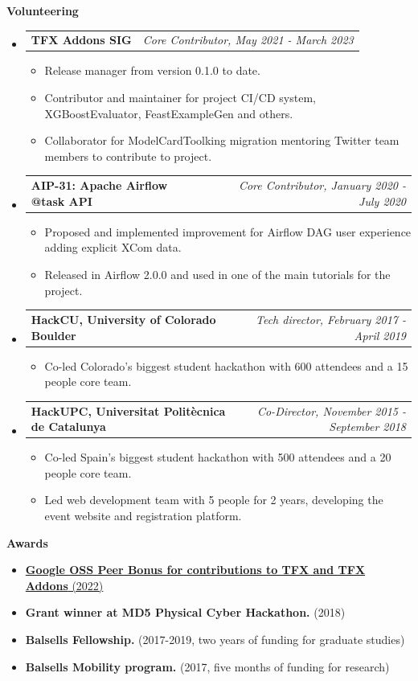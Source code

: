 \documentclass[letterpaper,10pt]{article}
\makeatletter
\newcommand{\resitem}[1]{\item #1 \vspace{-2pt}}
\newcommand{\resheading}[1]{{\large \colorbox{mygrey}{\begin{minipage}{\textwidth}{\textbf{#1 \vphantom{p\^{E}}}}\end{minipage}}}}
\newcommand{\ressubheading}[4]{
\begin{tabular*}{7.0in}{l@{\extracolsep{\fill}}r}
		\textbf{#1} & \textit{#4} \\
\end{tabular*}\vspace{-6pt}}
\makeatother
\begin{document}
\resheading{Volunteering}
	\begin{itemize}
\item 
		\ressubheading{TFX Addons SIG}{Boulder, CO}{Core Contributor}{Core Contributor, May 2021 - March 2023}
			\begin{itemize}
				\resitem{Release manager from version 0.1.0 to date.}
				\resitem{Contributor and maintainer for project CI/CD system, XGBoostEvaluator, FeastExampleGen and others.}
				\resitem{Collaborator for ModelCardToolking migration mentoring Twitter team members to contribute to project.} 
			\end{itemize}
		\item
			\ressubheading{AIP-31: Apache Airflow @task API}{Boulder, CO, USA}{ML Engineer}{Core Contributor, January 2020 - July 2020}
			\begin{itemize}
				\resitem{Proposed and implemented improvement for Airflow DAG user experience adding explicit XCom data.}
				\resitem{Released in Airflow 2.0.0 and used in one of the main tutorials for the project.}
				
			\end{itemize}
		\item 
			\ressubheading{HackCU, University of Colorado Boulder}{Boulder, CO}{Tech director}{Tech director, February 2017 - April 2019}
			\begin{itemize}
				\resitem{Co-led Colorado's biggest student hackathon with 600 attendees and a 15 people core team.}
			\end{itemize}
		\item
			\ressubheading{HackUPC, Universitat Polit\`ecnica de Catalunya}{Barcelona, Spain}{Co-Director and organizer}{Co-Director, November 2015 - September 2018}
			\begin{itemize}
				\resitem{Co-led Spain's biggest student hackathon with 500 attendees and a 20 people core team.}
				\resitem{Led web development team with 5 people for 2 years, developing the event website and registration platform.}
			\end{itemize}

			
	\end{itemize}


\resheading{Awards}
	\begin{itemize}
		\resitem{\href{https://opensource.googleblog.com/2022/03/Announcing-First-Group-of-Google-Open-Source-Peer-Bonus-Winners-in-2022.html}{\textbf{Google OSS Peer Bonus for contributions to TFX and TFX Addons} (2022)}}
		\resitem{\textbf{Grant winner at MD5 Physical Cyber Hackathon.} (2018)}
		\resitem{\textbf{Balsells Fellowship.} (2017-2019, two years of funding for graduate studies)}
		\resitem{\textbf{Balsells Mobility program.} (2017, five months of funding for research)}
	\end{itemize}
\end{document}
